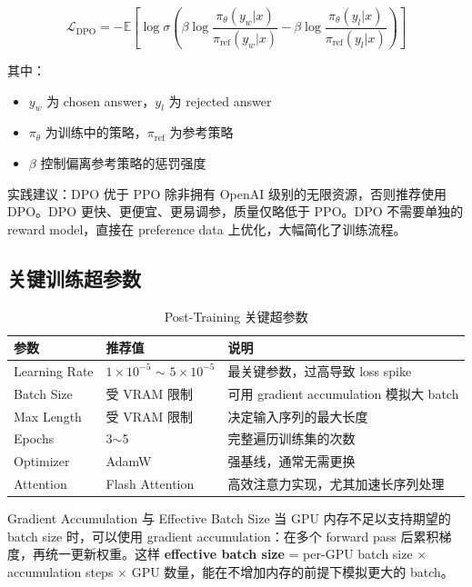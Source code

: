 $$\mathcal{L}_{\text{DPO}} = -\mathbb{E}\left[\log \sigma\left(\beta \log \frac{\pi_\theta(y_w|x)}{\pi_{\text{ref}}(y_w|x)} - \beta \log \frac{\pi_\theta(y_l|x)}{\pi_{\text{ref}}(y_l|x)}\right)\right]$$

其中：
\begin{itemize}
    \item $y_w$ 为 chosen answer，$y_l$ 为 rejected answer
    \item $\pi_\theta$ 为训练中的策略，$\pi_{\text{ref}}$ 为参考策略
    \item $\beta$ 控制偏离参考策略的惩罚强度
\end{itemize}

\begin{importantbox}{实践建议：DPO 优于 PPO}
除非拥有 OpenAI 级别的无限资源，否则推荐使用 DPO。DPO 更快、更便宜、更易调参，质量仅略低于 PPO。DPO 不需要单独的 reward model，直接在 preference data 上优化，大幅简化了训练流程。
\end{importantbox}

\subsection{关键训练超参数}

\begin{table}[H]
\centering
\caption{Post-Training 关键超参数}
\begin{tabular}{lll}
\toprule
\textbf{参数} & \textbf{推荐值} & \textbf{说明} \\
\midrule
Learning Rate & $1 \times 10^{-5}$ $\sim$ $5 \times 10^{-5}$ & 最关键参数，过高导致 loss spike \\
Batch Size & 受 VRAM 限制 & 可用 gradient accumulation 模拟大 batch \\
Max Length & 受 VRAM 限制 & 决定输入序列的最大长度 \\
Epochs & 3$\sim$5 & 完整遍历训练集的次数 \\
Optimizer & AdamW & 强基线，通常无需更换 \\
Attention & Flash Attention & 高效注意力实现，尤其加速长序列处理 \\
\bottomrule
\end{tabular}
\end{table}

\begin{knowledgebox}{Gradient Accumulation 与 Effective Batch Size}
当 GPU 内存不足以支持期望的 batch size 时，可以使用 gradient accumulation：在多个 forward pass 后累积梯度，再统一更新权重。这样 \textbf{effective batch size} = per-GPU batch size $\times$ accumulation steps $\times$ GPU 数量，能在不增加内存的前提下模拟更大的 batch。
\end{knowledgebox}

